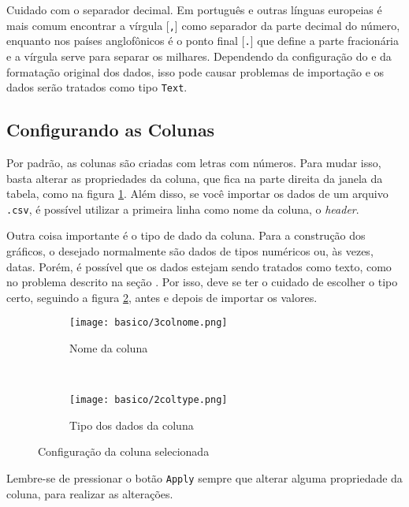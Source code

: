     \begin{lembrete}
        Cuidado com o separador decimal. Em português e outras línguas europeias é mais comum encontrar a vírgula [\texttt{,}] como separador da parte decimal do número, enquanto nos países anglofônicos é o ponto final [\texttt{.}] que define a parte fracionária e a vírgula serve para separar os milhares. Dependendo da configuração do \software e da formatação original dos dados, isso pode causar problemas de importação e os dados serão tratados como tipo \texttt{Text}.
    \end{lembrete}


\subsection{Configurando as Colunas} \label{sec:basico:renome}

    Por padrão, as colunas são criadas com letras com números. Para mudar isso, basta alterar as propriedades da coluna, que fica na parte direita da janela da tabela, como na figura \ref{fig:basico:colnome}. Além disso, se você importar os dados de um arquivo \texttt{.csv}, é possível utilizar a primeira linha como nome da coluna, o \textit{header}.

    Outra coisa importante é o tipo de dado da coluna. Para a construção dos gráficos, o desejado normalmente são dados de tipos numéricos ou, às vezes, datas. Porém, é possível que os dados estejam sendo tratados como texto, como no problema descrito na seção . Por isso, deve se ter o cuidado de escolher o tipo certo, seguindo a figura \ref{fig:basico:coltipo}, antes e depois de importar os valores.

    \begin{figure}[htbp]
        \begin{subfigure}{0.45\textwidth}
            \centering
            \texttt{[image: basico/3colnome.png]}

            \caption{Nome da coluna}
            \label{fig:basico:colnome}
        \end{subfigure}
        ~
        \centering
        \begin{subfigure}{0.45\textwidth}
            \centering
            \texttt{[image: basico/2coltype.png]}

            \caption{Tipo dos dados da coluna}
            \label{fig:basico:coltipo}
        \end{subfigure}
        \caption{Configuração da coluna selecionada}
        \label{fig:basico:config}
    \end{figure}

    \begin{lembrete}
        Lembre-se de pressionar o botão \texttt{Apply} sempre que alterar alguma propriedade da coluna, para realizar as alterações.
    \end{lembrete}
